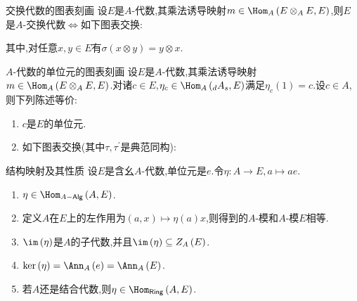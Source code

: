 \begin{proposition}{交换代数的图表刻画}{}
	设$E$是$A$-代数,其乘法诱导映射$m\in\Hom_{A}\left(E\otimes_{A}E,E\right)$,则$E$是$A$-交换代数$\iff$如下图表交换:
	\begin{center}
	\end{center}
	其中,对任意$x,y\in E$有$\sigma\left(x\otimes y\right)=y\otimes x$.
\end{proposition}

\begin{proposition}{$A$-代数的单位元的图表刻画}{}
	设$E$是$A$-代数,其乘法诱导映射$m\in\Hom_{A}\left(E\otimes_{A}E,E\right)$.对诸$c\in E$,$\eta_{c}\in\Hom_{A}\left(_{d}A_{s},E\right)$满足$\eta_{c}\left(1\right)=c$.设$c\in A$,则下列陈述等价:
	\begin{enumerate}
		\item $c$是$E$的单位元.
		\item 如下图表交换(其中$\tau,\tau^{\prime}$是典范同构):
		\begin{center}
		\end{center}
	\end{enumerate}
\end{proposition}

\begin{proposition}{结构映射及其性质}{}
	设$E$是含幺$A$-代数,单位元是$e$.令$\eta:A\to E,a\mapsto ae$.
	\begin{enumerate}
		\item $\eta\in\Hom_{A-\mathsf{Alg}}\left(A,E\right)$.
		\item 定义$A$在$E$上的左作用为$\left(a,x\right)\mapsto\eta\left(a\right)x$,则得到的$A$-模和$A$-模$E$相等.
		\item $\im\left(\eta\right)$是$A$的子代数,并且$\im\left(\eta\right)\subseteq Z_{A}\left(E\right)$.
		\item $\ker\left(\eta\right)=\Ann_{A}\left(e\right)=\Ann_{A}\left(E\right)$.
		\item 若$A$还是结合代数,则$\eta\in\Hom_{\mathsf{Ring}}\left(A,E\right)$.
	\end{enumerate}
\end{proposition}


